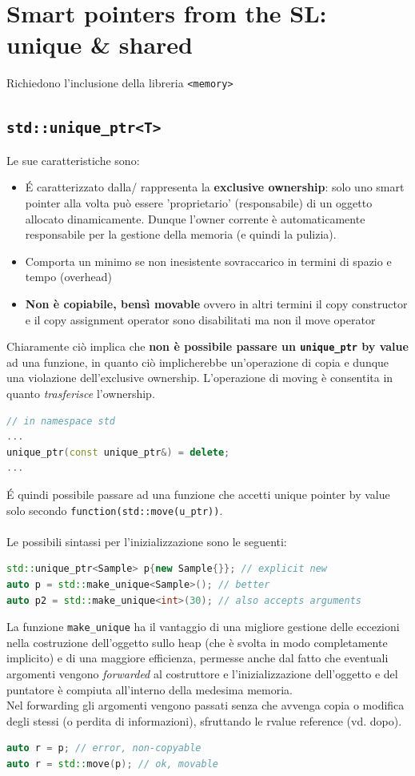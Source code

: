 \documentclass[10pt, oneside]{book}
\begin{document}
\section{Smart pointers from the SL: unique \& shared}
Richiedono l'inclusione della libreria \texttt{<memory>}

\subsection{\texttt{std::unique\_ptr<T>}}
Le sue caratteristiche sono:
\begin{itemize}
\item \'E caratterizzato dalla/ rappresenta la \textbf{exclusive ownership}: solo uno smart pointer alla volta può essere 'proprietario' (responsabile) di un oggetto allocato dinamicamente. Dunque l'owner corrente è automaticamente responsabile per la gestione della memoria (e quindi la pulizia).
\item Comporta un minimo se non inesistente sovraccarico in termini di spazio e tempo (overhead)
\item \textbf{Non è copiabile, bensì movable} ovvero in altri termini il copy constructor e il copy assignment operator sono disabilitati ma non il move operator
\end{itemize}
Chiaramente ciò implica che \textbf{non è possibile passare un \texttt{unique\_ptr} by value} ad una funzione, in quanto ciò implicherebbe un'operazione di copia e dunque una violazione dell'exclusive ownership. L'operazione di moving è consentita in quanto \textit{trasferisce} l'ownership.
\begin{lstlisting}[language=C++]
// in namespace std
...
unique_ptr(const unique_ptr&) = delete;
...
\end{lstlisting}
\'E quindi possibile passare ad una funzione che accetti unique pointer by value solo secondo \texttt{function(std::move(u\_ptr))}.\\~\\
Le possibili sintassi per l'inizializzazione sono le seguenti:
\begin{lstlisting}[language=C++]
std::unique_ptr<Sample> p{new Sample{}}; // explicit new
auto p = std::make_unique<Sample>(); // better
auto p2 = std::make_unique<int>(30); // also accepts arguments
\end{lstlisting}
La funzione \texttt{make\_unique} ha il vantaggio di una migliore gestione delle eccezioni nella costruzione dell'oggetto sullo heap (che è svolta in modo completamente implicito) e di una maggiore efficienza, permesse anche dal fatto che eventuali argomenti vengono \textit{forwarded} al costruttore e l'inizializzazione dell'oggetto e del puntatore è compiuta all'interno della medesima memoria.\\
Nel forwarding gli argomenti vengono passati senza che avvenga copia o modifica degli stessi (o perdita di informazioni), sfruttando le rvalue reference (vd. dopo).
\begin{lstlisting}[language=C++]
auto r = p; // error, non-copyable
auto r = std::move(p); // ok, movable
\end{lstlisting}
\end{document}
